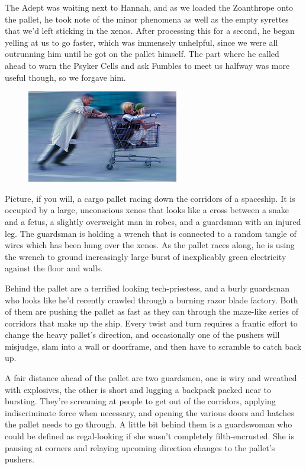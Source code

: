 The Adept was waiting next to Hannah, and as we loaded the Zoanthrope onto the pallet, he took note of the minor phenomena as well as the empty syrettes that we'd left sticking in the xenos. 
After processing this for a second, he began yelling at us to go faster, which was immensely unhelpful, since we were all outrunning him until he got on the pallet himself. 
The part where he called ahead to warn the Psyker Cells and ask Fumbles to meet us halfway was more useful though, so we forgave him.
\begin{figure}
	\begin{center}
		\includegraphics[width=\figwidth]{pics/12/64.png}
	\end{center}
\end{figure}
Picture, if you will, a cargo pallet racing down the corridors of a spaceship. 
It is occupied by a large, unconscious xenos that looks like a cross between a snake and a fetus, a slightly overweight man in robes, and a guardsman with an injured leg. 
The guardsman is holding a wrench that is connected to a random tangle of wires which has been hung over the xenos. 
As the pallet races along, he is using the wrench to ground increasingly large burst of inexplicably green electricity against the floor and walls.

Behind the pallet are a terrified looking tech-priestess, and a burly guardsman who looks like he'd recently crawled through a burning razor blade factory. 
Both of them are pushing the pallet as fast as they can through the maze-like series of corridors that make up the ship. 
Every twist and turn requires a frantic effort to change the heavy pallet's direction, and occasionally one of the pushers will misjudge, slam into a wall or doorframe, and then have to scramble to catch back up.

A fair distance ahead of the pallet are two guardsmen, one is wiry and wreathed with explosives, the other is short and lugging a backpack packed near to bursting. 
They're screaming at people to get out of the corridors, applying indiscriminate force when necessary, and opening the various doors and hatches the pallet needs to go through. 
A little bit behind them is a guardswoman who could be defined as regal-looking if she wasn't completely filth-encrusted. 
She is pausing at corners and relaying upcoming direction changes to the pallet's pushers.

